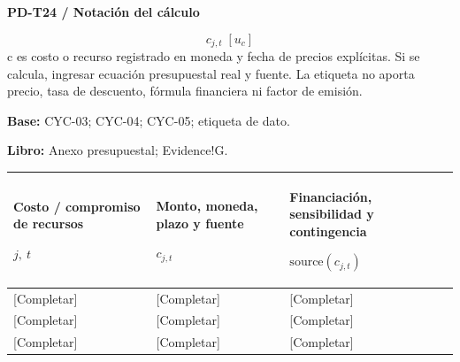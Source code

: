 \par\begingroup\sffamily\fontsize{8}{10}\selectfont\color{NEBGreen}\setlength{\parskip}{2pt}\setlength{\abovedisplayskip}{4pt}\setlength{\belowdisplayskip}{4pt}\setlength{\abovedisplayshortskip}{2pt}\setlength{\belowdisplayshortskip}{3pt}
\textbf{PD-T24 / Notación del cálculo}\par
{\fontsize{9}{11}\selectfont\[ c_{j,t}\;[u_c] \]}
c es costo o recurso registrado en moneda y fecha de precios explícitas. Si se calcula, ingresar ecuación presupuestal real y fuente. La etiqueta no aporta precio, tasa de descuento, fórmula financiera ni factor de emisión.\par
\textbf{Base:} CYC-03; CYC-04; CYC-05; etiqueta de dato.\par
\textbf{Libro:} Anexo presupuestal; Evidence!G.\par\endgroup
{\sffamily\fontsize{8.3}{10.3}\selectfont\begin{longtable}{@{}P{51.14mm} P{57.74mm} P{56.09mm}@{}}
\toprule
\textbf{Costo / compromiso de recursos}\par {\normalfont\fontsize{8.2}{10}\selectfont $j,\ t$} & \textbf{Monto, moneda, plazo y fuente}\par {\normalfont\fontsize{8.2}{10}\selectfont $c_{j,t}$} & \textbf{Financiación, sensibilidad y contingencia}\par {\normalfont\fontsize{8.2}{10}\selectfont $\text{source}(c_{j,t})$}\\\midrule\endhead
\rule{0pt}{7.7mm}[Completar] & [Completar] & [Completar]\\\hline
\rule{0pt}{7.7mm}[Completar] & [Completar] & [Completar]\\\hline
\rule{0pt}{7.7mm}[Completar] & [Completar] & [Completar]\\\hline
\end{longtable}}
\par\begingroup\sffamily\fontsize{8}{10}\selectfont\color{NEBGreen}\setlength{\parskip}{2pt}\setlength{\abovedisplayskip}{4pt}\setlength{\belowdisplayskip}{4pt}\setlength{\abovedisplayshortskip}{2pt}\setlength{\belowdisplayshortskip}{3pt}
